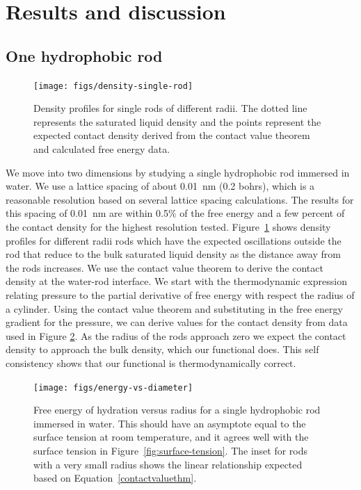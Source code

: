 \documentclass[letterpaper,twocolumn,amsmath,amssymb,prb]{revtex4-1}
\begin{document}
\section{Results and discussion}

\subsection{One hydrophobic rod}

\begin{figure}
\begin{center}
\texttt{[image: figs/density-single-rod]}
\end{center}
\caption{ Density profiles for single rods of different radii. The dotted line
represents the saturated liquid density and the points represent the
expected contact density derived from the contact value theorem and
calculated free energy data.}
\label{fig:density-single-rod}
\end{figure}

We move into two dimensions by studying a single hydrophobic rod
immersed in water. We use a lattice spacing of about 0.01~nm (0.2 bohrs), 
which is a reasonable resolution based on several lattice spacing calculations.
The results for this spacing of 0.01~nm are within 0.5\% of the free energy 
and a few percent of the contact density for the highest resolution tested.
Figure~\ref{fig:density-single-rod} shows density profiles for
different radii rods which have the
expected oscillations outside the rod that reduce to the bulk saturated liquid
density as the distance away from the rods increases. We use the
contact value theorem to derive the contact density at the water-rod
interface.  We start with the thermodynamic expression relating
pressure to the partial derivative of free energy with respect the
radius of a cylinder. Using the contact value theorem and substituting in
the free energy gradient for the pressure, we can derive values for
the contact density from data used in Figure
\ref{fig:energy-vs-diameter}.  As the radius of the rods approach zero we
expect the contact density to approach the bulk density, which our
functional does.  This self consistency shows that our functional is
thermodynamically correct.

\begin{figure}
\begin{center}
\texttt{[image: figs/energy-vs-diameter]}
\end{center}
\caption{ Free energy of hydration versus radius for a single hydrophobic rod
immersed in water. This should have an asymptote equal to the surface
tension at room temperature, and it agrees well with the surface tension in
Figure~\ref{fig:surface-tension}. The inset for rods with a very small 
radius shows the linear relationship expected based on 
Equation~\ref{contactvaluethm}.}
\label{fig:energy-vs-diameter}
\end{figure}
\end{document}

